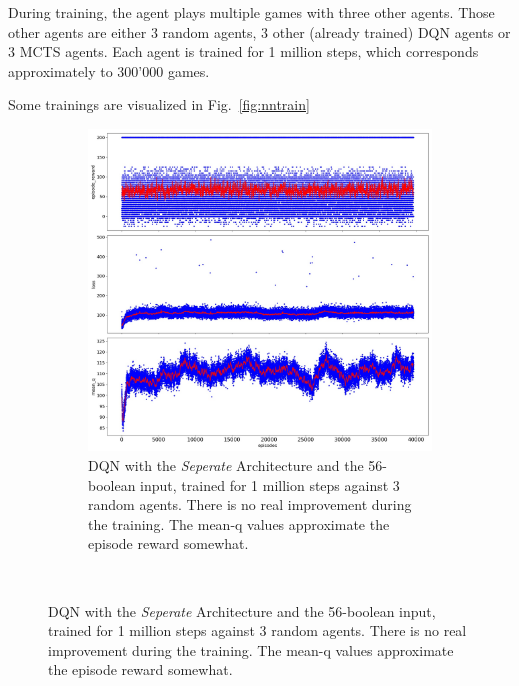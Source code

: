 During training, the agent plays multiple games with three other agents. Those other agents are either 3 random agents, 3 other (already trained) DQN agents or 3 MCTS agents.
Each agent is trained for 1 million steps, which corresponds approximately to 300'000 games.

Some trainings are visualized in Fig.~\ref{fig:nntrain}

\begin{figure}[hb]
    \begin{center}
        \begin{subfigure}[h]{.5\textwidth}\includegraphics[width=\textwidth]{images/DQNAgent2L_56x5_2_sep_random_2017-06-05_15-25-01_steps_1000000}
            \caption{DQN with the \textit{Seperate} Architecture and the 56-boolean input, trained for 1 million steps against 3 random agents. There is no real improvement during the training. The mean-q values approximate the episode reward somewhat.}
        \end{subfigure}
\\

\end{center}
\end{figure}

